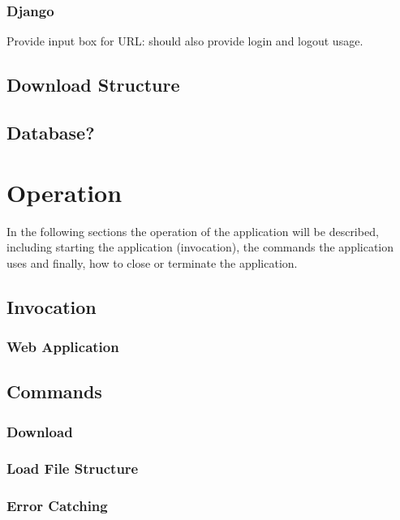 \documentclass{article}
\begin{document}
            \subsubsection{Django}
            Provide input box for URL: should also provide login and logout usage.

        \subsection{Download Structure}

        \subsection{Database?}

    \section{Operation}
    In the following sections the operation of the application will be described, including starting the application
    (invocation), the commands the application uses and finally, how to close or terminate the application.

        \subsection{Invocation}
            \subsubsection{Web Application}

        \subsection{Commands}
            \subsubsection{Download}
            
            \subsubsection{Load File Structure}

            \subsubsection{Error Catching}
\end{document}

